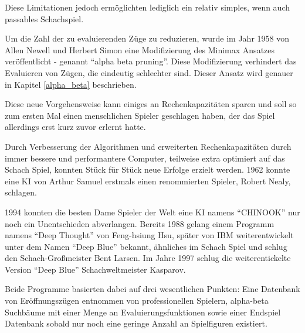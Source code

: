 
Diese Limitationen jedoch ermöglichten lediglich ein relativ simples, wenn auch passables Schachspiel.


Um die Zahl der zu evaluierenden Züge zu reduzieren, wurde im Jahr 1958 von Allen Newell und Herbert Simon eine Modifizierung des Minimax Ansatzes veröffentlicht - genannt ``alpha beta pruning''. Diese Modifizierung verhindert das Evaluieren von Zügen, die eindeutig schlechter sind. Dieser Ansatz wird genauer in Kapitel \ref{alpha_beta} beschrieben. \cite{Newell2010}


Diese neue Vorgehensweise kann einiges an Rechenkapazitäten sparen und soll so zum ersten Mal einen menschlichen Spieler geschlagen haben, der das Spiel allerdings erst kurz zuvor erlernt hatte. \cite{Kurenkov2019}

Durch Verbesserung der Algorithmen und erweiterten Rechenkapazitäten durch immer bessere und performantere Computer, teilweise extra optimiert auf das Schach Spiel, konnten Stück für Stück neue Erfolge erzielt werden. 1962 konnte eine KI von Arthur Samuel erstmals einen renommierten Spieler, Robert Nealy, schlagen. \cite{Kurenkov2019}

1994 konnten die besten Dame Spieler der Welt eine KI namens ``CHINOOK'' nur noch ein Unentschieden abverlangen. \cite{Schaeffer1996} Bereits 1988 gelang einem Programm namens ``Deep Thought'' von Feng-hsiung Hsu, später von IBM weiterentwickelt unter dem Namen ``Deep Blue'' bekannt, ähnliches im Schach Spiel und schlug den Schach-Großmeister Bent Larsen. Im Jahre 1997 schlug die weiterentickelte Version ``Deep Blue'' Schachweltmeister Kasparov.\cite{Kurenkov2019}

Beide Programme basierten dabei auf drei wesentlichen Punkten: Eine Datenbank von Eröffnungszügen entnommen von professionellen Spielern, alpha-beta Suchbäume mit einer Menge an Evaluierungsfunktionen sowie einer Endspiel Datenbank sobald nur noch eine geringe Anzahl an Spielfiguren existiert. \cite{Kurenkov2019}

